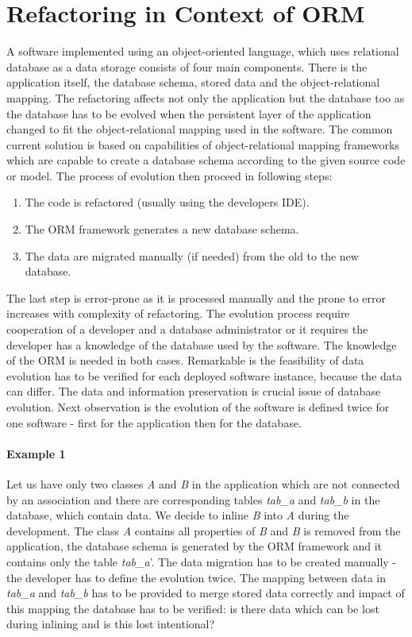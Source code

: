 \documentclass[runningheads]{comsis}
\begin{document}
\section{Refactoring in Context of ORM} 
\label{sec:problem}
A software implemented using an object-oriented language, which uses relational database as a data storage consists of four main components. There is the application itself, the database schema, stored data and the object-relational mapping. The refactoring affects not only the application but the database too as the database has to be evolved when the persistent layer of the application changed to fit the object-relational mapping used in the software. The common current solution is based on capabilities of object-relational mapping frameworks which are capable to create a database schema according to the given source code or model. The process of evolution then proceed in following steps:
\begin{enumerate}
	\item The code is refactored (usually using the developers IDE).
	\item The ORM framework generates a new database schema.
	\item The data are migrated manually (if needed) from the old to the new database.
\end{enumerate}
The last step is error-prone as it is processed manually and the prone to error increases with complexity of refactoring. The evolution process require cooperation of a developer and a database administrator or it requires the developer has a knowledge of the database used by the software. The knowledge of the ORM is needed in both cases. Remarkable is the feasibility of data evolution has to be verified for each deployed software instance, because the data can differ. The data and information preservation is crucial issue of database evolution. Next observation is the evolution of the software is defined twice for one software - first for the application then for the database. 

\paragraph{Example 1} Let us have only two classes \emph{A} and \emph{B} in the application which are not connected by an association and there are corresponding tables \emph{tab\_a} and \emph{tab\_b} in the database, which contain data. We decide to inline \emph{B} into \emph{A}  during the development. The class \emph{A} contains all properties of \emph{B} and \emph{B} is removed from the application, the database schema is generated by the ORM framework and it contains only the table \emph{tab\_a}'. The data migration has to be created manually - the developer has to define the evolution twice. The mapping between data in \emph{tab\_a} and \emph{tab\_b} has to be provided to merge stored data correctly and impact of this mapping the database has to be verified: is there data which can be lost during inlining and is this lost intentional? 
\end{document}
